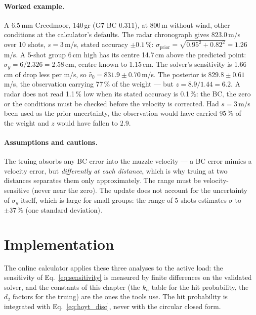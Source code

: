 \documentclass[11pt,twoside,openright]{report}
\begin{document}
\paragraph{Worked example.} A 6.5\,mm Creedmoor, 140\,gr (G7 BC 0.311), at 800\,m without wind, other conditions at the calculator's defaults. The radar chronograph gives $823.0$\,m/s over 10 shots, $s = 3$\,m/s, stated accuracy $\pm 0.1\,\%$: $\sigma_{\text{prior}} = \sqrt{0.95^2 + 0.82^2} = 1.26$\,m/s. A 5-shot group 6\,cm high has its centre 14.7\,cm above the predicted point: $\sigma_y = 6/2.326 = 2.58$\,cm, centre known to 1.15\,cm. The solver's sensitivity is 1.66\,cm of drop less per m/s, so $\hat{v}_0 = 831.9 \pm 0.70$\,m/s. The posterior is $829.8 \pm 0.61$\,m/s, the observation carrying 77\,\% of the weight --- but $z = 8.9/1.44 = 6.2$. A radar does not read 1.1\,\% low when its stated accuracy is 0.1\,\%: the BC, the zero or the conditions must be checked before the velocity is corrected. Had $s = 3$\,m/s been used as the prior uncertainty, the observation would have carried 95\,\% of the weight and $z$ would have fallen to 2.9.

\paragraph{Assumptions and cautions.} The truing absorbs any BC error into the muzzle velocity --- a BC error mimics a velocity error, but \emph{differently at each distance}, which is why truing at two distances separates them only approximately. The range must be velocity-sensitive (never near the zero). The update does not account for the uncertainty of $\sigma_y$ itself, which is large for small groups: the range of 5 shots estimates $\sigma$ to $\pm 37\,\%$ (one standard deviation).

\section{Implementation}

The online calculator applies these three analyses to the active load: the sensitivity of Eq.~\eqref{eq:sensitivity} is measured by finite differences on the validated solver, and the constants of this chapter (the $k_n$ table for the hit probability, the $d_2$ factors for the truing) are the ones the tools use. The hit probability is integrated with Eq.~\eqref{eq:hoyt_disc}, never with the circular closed form.

\end{document}
